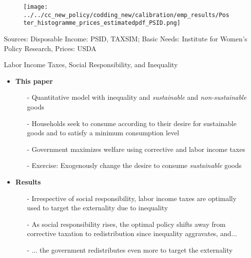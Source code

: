 \begin{frame}{}
\vspace{4mm}
\begin{minipage}[]{1\textwidth}
	\begin{figure}
		\texttt{[image: ../../cc\_new\_policy/codding\_new/calibration/emp\_results/Poster\_histogramme\_prices\_estimatedpdf\_PSID.png]}	
	\end{figure}
	\centering
	\tiny{Sources: Disposable Income: PSID, TAXSIM; Basic Needs: Institute for Women's Policy Research, Prices: USDA}
\end{minipage}\end{frame}


\begin{frame}{Labor Income Taxes, Social Responsibility, and Inequality}
	
	\begin{itemize}[<+->]
		\item \textbf{This paper}
		\begin{itemize}
			\item[-] Quantitative model with inequality and  \textit{sustainable} and \textit{non-sustainable} goods
			\item[-] Households seek to consume according to their desire for sustainable goods and to satisfy a minimum consumption level
			\item[-] Government maximizes welfare using corrective and labor income taxes
			\item[-] Exercise: Exogenously change the desire to consume \textit{sustainable} goods
		\end{itemize}
		\item \textbf{Results}	
		\begin{itemize}
			\item[-] Irrespective of social responsibility, labor income taxes are optimally used to target the externality due to inequality
			\item[-] As social responsibility rises, the optimal policy shifts away from corrective taxation to redistribution since inequality aggravates, and...
			\item[-] ... the government redistributes even more to target the externality
		\end{itemize}
				
		\end{itemize}
	\end{frame}

